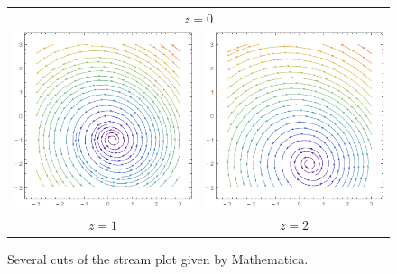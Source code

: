 \documentclass{article}
\begin{document}
\begin{figure}[h]
\begin{tabular}{c c}
		\multicolumn{2}{c}{$z=0$}\\
		\includegraphics[scale=0.5]{spz1}  & \includegraphics[scale=0.5]{spz2}  \\
		$z=1$                              & $z=2$
	\end{tabular}
	\caption{Several cuts of the stream plot given by Mathematica.}
	\label{fig:plot_cuts}
\end{figure}

\newpage
\clearpage
\nocite{*}
\printbibliography
\end{document}
